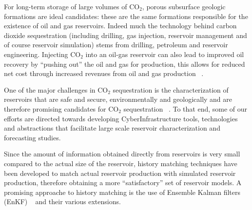 \documentclass[a4paper,10pt]{article}
\begin{document}
For long-term storage of large volumes of CO$_2$, porous subsurface geologic formations are ideal 
candidates: these are the same formations responsible for the existence of oil and gas reservoirs. 
Indeed much the technology behind carbon dioxide sequestration (including drilling, gas injection, 
reservoir management and of course reservoir simulation) stems from drilling, petroleum and 
reservoir engineering. Injecting CO$_2$ into an oil-gas reservoir can also lead to improved oil 
recovery by ``pushing out'' the oil and gas for production, this allows for reduced net cost 
through increased revenues from oil and gas production ~\cite{EORBook}.


One of the major challenges in CO$_2$ sequestration is the characterization of reservoirs that are 
safe and secure, environmentally and geologically and are therefore promising candidates for CO$_2$ 
sequestration ~\cite{GeoRPT,Luigi,Pruess2004,Pawar}. To that end, some of our efforts are directed towards 
developing CyberInfrastructure tools, technologies and abstractions that facilitate large scale 
reservoir characterization and forecasting studies.

Since the amount of information obtained directly from reservoirs is very small compared to the 
actual size of the reservoir, history matching techniques have been developed to match actual 
reservoir production with simulated reservoir production, therefore obtaining a more 
``satisfactory'' set of reservoir models. A promising approache to history matching is 
the use of Ensemble Kalman filters (EnKF) ~\cite{KalmanPaper, DO2007, LiEnKF07, DO2006,Burger98}
and their various extensions.
\end{document}
